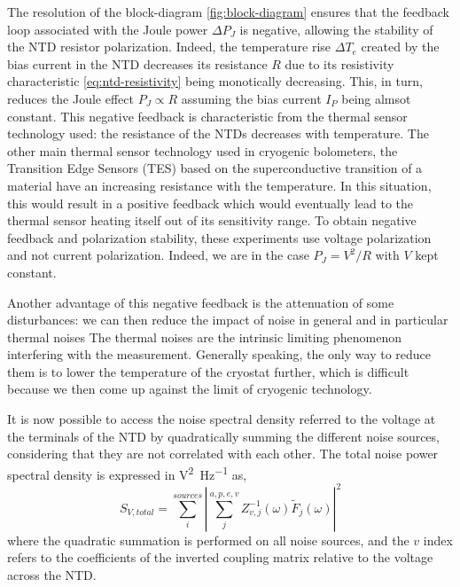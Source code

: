 The resolution of the block-diagram \ref{fig:block-diagram} ensures that the feedback loop associated with the Joule power $\Delta P_J$ is negative, allowing the stability of the NTD resistor polarization. Indeed, the temperature rise $\Delta T_e$ created by the bias current in the NTD decreases its resistance $R$ due to its resistivity characteristic \ref{eq:ntd-resistivity} being monotically decreasing. This, in turn, reduces the Joule effect $P_J \propto R$ assuming the bias current $I_P$ being almsot constant.
This negative feedback is characteristic from the thermal sensor technology used: the resistance of the NTDs decreases with temperature. The other main thermal sensor technology used in cryogenic bolometers, the Transition Edge Sensors (TES) based on the superconductive transition of a material have %
an increasing resistance with the temperature. In this situation, this would result in a positive feedback which would eventually lead to the thermal sensor heating itself out of its sensitivity range. To obtain negative feedback and polarization stability, these experiments use voltage polarization and not current polarization. Indeed, we are in the case $P_J=V^2/R$ with $V$ kept constant.

Another advantage of this negative feedback is the attenuation of some disturbances: we can then reduce the impact of noise in general and in particular thermal noises
The thermal noises are the intrinsic limiting phenomenon interfering with the measurement. Generally speaking, the only way to reduce them is to lower the temperature of the cryostat further, which is difficult because we then come up against the limit of cryogenic technology.

It is now possible to access the noise spectral density referred to the voltage at the terminals of the NTD by quadratically summing the different noise sources, considering that they are not correlated with each other. The total noise power spectral density is expressed in \si{\volt^2\per\Hz} as,
\begin{equation}
\label{eq:ethem-psd-total}
S_{V,total} = \sum_i^{sources} \left\vert \sum_j^{a,p,e,v} Z_{v,j}^{-1} (\omega) \tilde{F}_j(\omega) \right\vert^2
\end{equation}
where the quadratic summation is performed on all noise sources, and the $v$ index refers to the coefficients of the inverted coupling matrix relative to the voltage across the NTD.

